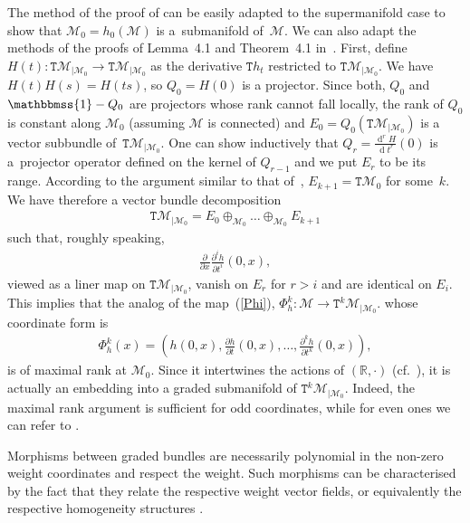 \documentclass[pdftex]{sigma}
\newcommand{\Id}{\mathbbmss{1}}
\def\sT{{\mathtt T}}
\def\xd{\operatorname{d}}
\numberwithin{equation}{section}
\begin{document}
\begin{Remark}
The method of the proof of \cite[Theorem~1.13]{KMS} can be easily adapted to the supermanifold case to show that ${\mathcal M}_0=h_0({\mathcal M})$ is a~submanifold of~${\mathcal M}$. We can also adapt the methods of the proofs of Lemma~4.1 and Theorem~4.1 in~\cite{Grabowski2012}.
First, def\/ine $H(t)\colon \sT{\mathcal M}_{|{\mathcal M}_0}\to\sT{\mathcal M}_{|{\mathcal M}_0}$ as the derivative $\sT {h_t}$ restricted to $\sT{\mathcal M}_{|{\mathcal M}_0}$. We have $H(t)H(s)=H(ts)$, so $Q_0=H(0)$ is a projector. Since both, $Q_0$ and $\Id-Q_0$ are projectors whose rank cannot fall locally, the rank of $Q_0$ is constant along ${\mathcal M}_0$ (assuming ${\mathcal M}$ is connected) and $E_0=Q_0(\sT{\mathcal M}_{|{\mathcal M}_0})$ is a vector subbundle of~$\sT{\mathcal M}_{|{\mathcal M}_0}$. One can show inductively that
$Q_r=\frac{\xd^r H}{\xd t^r}(0)$ is a~projector operator def\/ined on the kernel of $Q_{r-1}$ and we put
$E_r$ to be its range. According to the argument similar to that of~\cite[Proposition~4.2]{Grabowski2012}, $E_{k+1}=\sT{\mathcal M}_0$ for some~$k$. We have therefore
a vector bundle decomposition
\begin{gather*}
\sT{\mathcal M}_{|{\mathcal M}_0}=E_0\oplus_{{\mathcal M}_0}\dots\oplus_{{\mathcal M}_0}E_{k+1}
\end{gather*}
such that, roughly speaking,
\begin{gather*}
\frac{\partial}{\partial x}\frac{\partial^i h}{\partial t^i}(0,x) ,
\end{gather*}
viewed as a liner map on $\sT{\mathcal M}_{|{\mathcal M}_0}$, vanish on $E_r$ for $r>i$ and are identical on $E_i$.
This implies that the analog of the map~(\ref{Phi}), $\Phi^k_h\colon {\mathcal M}\to\sT^k{\mathcal M}_{|{\mathcal M}_0}$.
whose coordinate form is
\begin{gather*}
\Phi^k_h(x)=\left(h(0,x),\frac{\partial h}{\partial t}(0,x),\dots,\frac{\partial^k h}{\partial t^k}(0,x)\right) ,
\end{gather*}
is of maximal rank at ${\mathcal M}_0$. Since it intertwines the actions of $({\mathbb R},\cdot)$ (cf.~\cite[Lemma~4.1]{Grabowski2012}), it is actually an embedding into a graded submanifold of $\sT^k{\mathcal M}_{|{\mathcal M}_0}$.
Indeed, the maximal rank argument is suf\/f\/icient for odd coordinates, while for even ones we can refer to \cite{Grabowski2012}.
\end{Remark}


Morphisms between graded bundles are necessarily polynomial in the non-zero weight coordinates and respect the weight. Such morphisms can be characterised by the fact that they relate the respective weight vector f\/ields,  or equivalently the respective homogeneity structures  \cite{Grabowski2012}.
\end{document}

